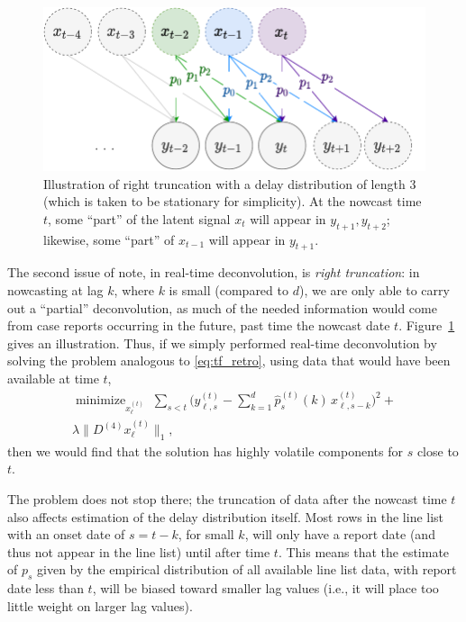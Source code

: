 \documentclass[sts]{imsart}
\newcommand{\minimize}{\mathop{\mathrm{minimize}}}
\def\hx{\hat{x}}
\def\hp{\hat{p}}
\theoremstyle{plain}
\theoremstyle{definition}
\theoremstyle{remark}
\begin{document}
\begin{figure}[tb]
\centering	
\includegraphics[width=0.95\linewidth]{./figures/right_truncation_illustration.pdf}
\caption{Illustration of right truncation with a delay distribution of length 3
  (which is taken to be stationary for simplicity). At the nowcast time $t$,
  some ``part'' of the latent signal $x_t$ will appear in $y_{t+1},y_{t+2}$;
  likewise, some ``part'' of $x_{t-1}$ will appear in $y_{t+1}$.}   
\label{fig:right_truncation}
\end{figure}

The second issue of note, in real-time deconvolution, is \emph{right
  truncation}: in nowcasting at lag $k$, where $k$ is small (compared to $d$),
we are only able to carry out a ``partial'' deconvolution, as much of the needed  
information would come from case reports occurring in the future, past time the
nowcast date $t$. Figure~\ref{fig:right_truncation} gives an illustration. Thus,
if we simply performed real-time deconvolution by solving the problem analogous
to \eqref{eq:tf_retro}, using data that would have been available at time $t$,   
\begin{multline}
\label{eq:tf_realtime1}
\minimize_{x^{(t)}_\ell} \; \sum_{s < t} \bigg( y^{(t)}_{\ell,s} -
\sum_{k=1}^d \hp^{(t)}_s(k) \, x^{(t)}_{\ell, s-k} \bigg)^2 +{} \\  
\lambda \big\|D^{(4)} x^{(t)}_\ell\big\|_1,
\end{multline}
then we would find that the solution \smash{$\hx^{(t)}_\ell = (\hx^{(t)}_{\ell,s}
  : s < t)$} has highly volatile components for $s$ close to $t$.

The problem does not stop there; the truncation of data after the nowcast time
$t$ also affects estimation of the delay distribution itself. Most rows in the
line list with an onset date of $s=t-k$, for small $k$, will only have a report
date (and thus not appear in the line list) until after time $t$. This means
that the estimate \smash{$\hp^{(t)}_s$} of $p_s$ given by the empirical
distribution of all available line list data, with report date less than $t$,
will be biased toward smaller lag values (i.e., it will place too little weight
on larger lag values).    
\end{document}
